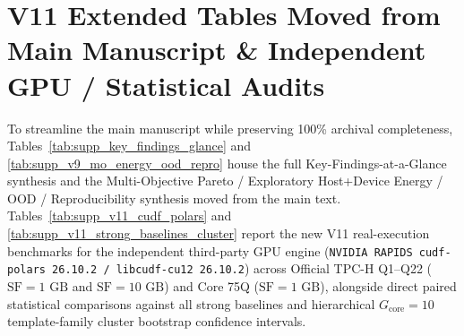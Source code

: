 \documentclass[10pt,a4paper]{article}
\begin{document}
\clearpage
\section{V11 Extended Tables Moved from Main Manuscript \& Independent GPU / Statistical Audits}
\label{sec:v11_supplementary_tables}

To streamline the main manuscript while preserving 100\% archival completeness, Tables~\ref{tab:supp_key_findings_glance} and \ref{tab:supp_v9_mo_energy_ood_repro} house the full Key-Findings-at-a-Glance synthesis and the Multi-Objective Pareto / Exploratory Host+Device Energy / OOD / Reproducibility synthesis moved from the main text. Tables~\ref{tab:supp_v11_cudf_polars} and \ref{tab:supp_v11_strong_baselines_cluster} report the new V11 real-execution benchmarks for the independent third-party GPU engine (\texttt{NVIDIA RAPIDS cudf-polars 26.10.2 / libcudf-cu12 26.10.2}) across Official TPC-H Q1--Q22 ($\text{SF}=1\text{ GB}$ and $\text{SF}=10\text{ GB}$) and Core 75Q ($\text{SF}=1\text{ GB}$), alongside direct paired statistical comparisons against all strong baselines and hierarchical $G_{\text{core}}=10$ template-family cluster bootstrap confidence intervals.
\end{document}
